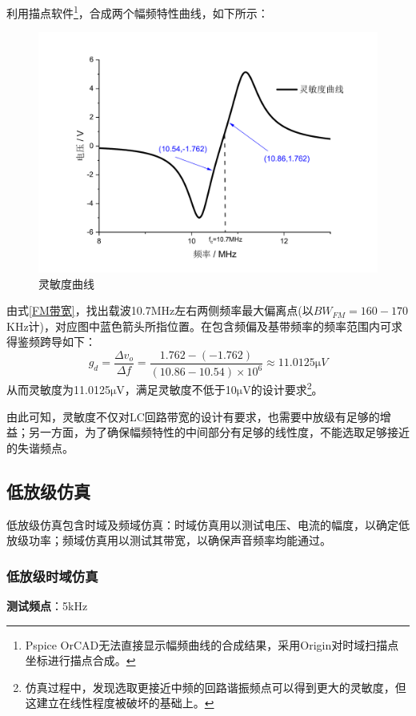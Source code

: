 \documentclass[a4paper,12pt,twoside]{article}
\begin{document}
利用描点软件\footnote{Pspice OrCAD无法直接显示幅频曲线的合成结果，采用Origin对时域扫描点坐标进行描点合成。}，合成两个幅频特性曲线，如下所示：
\begin{figure}[H]
    \centering
    \includegraphics[scale=0.36]{灵敏度曲线.pdf}
    \caption{灵敏度曲线}
    \label{灵敏度曲线}
\end{figure}
由式\ref{FM带宽}，找出载波10.7MHz左右两侧频率最大偏离点(以$BW_{FM}=160-170$KHz计)，对应图中蓝色箭头所指位置。在包含频偏及基带频率的频率范围内可求得鉴频跨导如下：
\begin{equation}
    g_d=\frac{\Delta v_o}{\Delta f}=\frac{1.762-(-1.762)}{(10.86-10.54)\times 10^{6}}\approx 11.0125\mathrm{\mu}V
    \label{式28}
\end{equation}
从而灵敏度为11.0125$\mathrm{\mu}$V，满足灵敏度不低于10$\mathrm{\mu}$V的设计要求\footnote{仿真过程中，发现选取更接近中频的回路谐振频点可以得到更大的灵敏度，但这建立在线性程度被破坏的基础上。}。

由此可知，灵敏度不仅对LC回路带宽的设计有要求，也需要中放级有足够的增益；另一方面，为了确保幅频特性的中间部分有足够的线性度，不能选取足够接近的失谐频点。

\subsection{低放级仿真}
低放级仿真包含时域及频域仿真：时域仿真用以测试电压、电流的幅度，以确定低放级功率；频域仿真用以测试其带宽，以确保声音频率均能通过。
\subsubsection{低放级时域仿真}
 \textbf{测试频点}：5kHz
 
\end{document}
